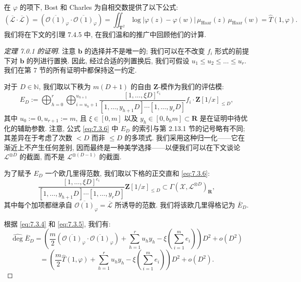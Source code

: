 在 \(\varphi\) 的项下, Bost 和 Charles \cite[定理 5.4.1 和命题 5.4.2]{BC22} 为自相交数提供了以下公式:
\begin{equation}\label{eq:7.3.5}
(\overline{\mathcal{L}} \cdot \overline{\mathcal{L}}) = \left(\overline{\mathcal{O}(1)}_{\varphi} \cdot \overline{\mathcal{O}(1)}_{\varphi}\right) = \iint_{\mathbf{T}^2} \log|\varphi(z) - \varphi(w)| \, \mu_{\text{Haar}}(z) \, \mu_{\text{Haar}}(w) = \widehat{T}(1, \varphi).
\end{equation}
我们将在下文的引理 7.4.5 中, 在我们温和的推广中回顾他们的计算.

\begin{proof}[定理 7.0.1 的证明]
注意 \(\mathbf{b}\) 的选择并不是唯一的; 我们可以在不改变 \(f_i\) 形式的前提下对 \(\mathbf{b}\) 的列进行置换. 
因此, 经过合适的列置换后, 我们可假设 \(u_1 \leq u_2 \leq \ldots \leq u_r\). 
我们在第 7 节的所有证明中都保持这一约定.

对于 \(D \in \mathbb{N}\), 我们取以下秩为 \(m(D+1)\) 的自由 \(\mathbf{Z}\)-模作为我们的评估模:
\begin{equation}\label{eq:7.3.6}
E_D := \bigoplus_{h=0}^r \bigoplus_{i=u_h+1}^{u_{h+1}} \frac{[1, \dots, \xi D]^{e_i}}{[1, \dots, y_{h+1}D] \cdots [1, \dots, y_rD]} f_i \cdot \mathbf{Z}[1/x]_{\leq D},
\end{equation}
其中 \(u_0 := 0, u_{r+1} := m\), 且 \(\xi \in [0, m]\) 以及 \(y_h \in [0, b_h m] \subset \mathbf{R}\) 是在证明中待优化的辅助参数. 
注意, 公式 \eqref{eq:7.3.6} 中 \(E_D\) 的索引与第 2.13.1 节的记号略有不同; 
其差异在于考虑了次数 \(< D\) 而非 \(\le D\) 的多项式. 
我们采用这种归一化——它在渐近上不产生任何差别, 因而最终是一种美学选择——以便我们可以在下文谈论 \(\mathcal{L}^{\otimes D}\) 的截面, 
而不是 \(\mathcal{L}^{\otimes (D-1)}\) 的截面.

为了赋予 \(E_D\) 一个欧几里得范数, 我们取以下格的正交直和 \eqref{eq:7.3.6}:
\[ \frac{[1,\ldots,\xi D]^{e_i}}{[1,\ldots,y_{h+1}D]\cdots[1,\ldots,y_rD]}\mathbf{Z}[1/x]_{\leq D}\subset\Gamma\left(\mathcal{X},\mathcal{L}^{\otimes D}\right)_{\mathbf{R}}, \]
其中每个加项都继承自 \(\overline{\mathcal{O}(1)}_{\varphi} = \overline{\mathcal{L}}\) 所诱导的范数. 
我们将该欧几里得格记为 \(\overline{E}_D\).

根据 \eqref{eq:7.3.4} 和 \eqref{eq:7.3.5}, 我们有:
\begin{equation}\label{eq:7.3.7}
\widehat{\operatorname{deg}} \overline{E}_D = \left( \frac{m}{2} \left( \overline{\mathcal{O}(1)}_{\varphi} \cdot \overline{\mathcal{O}(1)}_{\varphi} \right) + \sum_{h=1}^r u_h y_h - \xi \left( \sum_{i=1}^m e_i \right) \right) D^2 + o(D^2)
\end{equation}
\[ = \left( \frac{m}{2} \widehat{T}(1, \varphi) + \sum_{h=1}^r u_h y_h - \xi \left( \sum_{i=1}^m e_i \right) \right) D^2 + o(D^2). \]


\end{proof}

